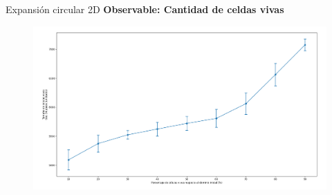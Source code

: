 \begin{frame}{Expansión circular 2D}
    \textbf{Observable: Cantidad de celdas vivas}
    \begin{figure}[H]
        \centering
        \includegraphics[width=0.8\linewidth]{pic/circular2d/observable}
        \label{fig:expcirc:size}
    \end{figure}
\end{frame}






